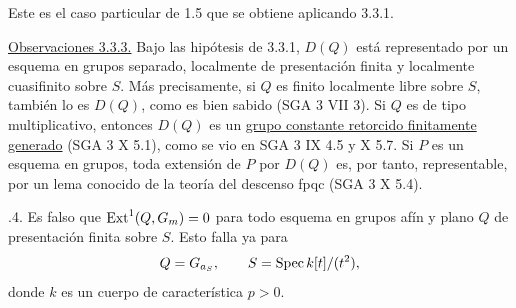 
Este es el caso particular de 1.5 que se obtiene aplicando 3.3.1.

\medskip
\noindent\underline{Observaciones 3.3.3.} Bajo las hipótesis de
3.3.1, $D(Q)$ está representado por un esquema en grupos separado,
localmente de presentación finita y localmente cuasifinito sobre $S$.
Más precisamente, si $Q$ es finito localmente libre sobre $S$, también
lo es $D(Q)$, como es bien sabido (SGA 3 VII 3). Si $Q$ es de tipo
multiplicativo, entonces $D(Q)$ es un \underline{grupo constante
retorcido finitamente generado} (SGA 3 X 5.1), como se vio en SGA 3 IX
4.5 y X 5.7. Si $P$ es un esquema en grupos, toda extensión de $P$ por
$D(Q)$ es, por tanto, representable, por un lema conocido de la teoría
del descenso fpqc (SGA 3 X 5.4).

\medskip
{}.4. Es falso que $\operatorname{Ext}^1(Q,G_m)=0$ para todo
esquema en grupos afín y plano $Q$ de presentación finita sobre $S$.
Esto falla ya para
\[
 Q=G_{a_S},\qquad
 S=\operatorname{Spec} k[t]/(t^2),
\]
donde $k$ es un cuerpo de característica $p>0$.
